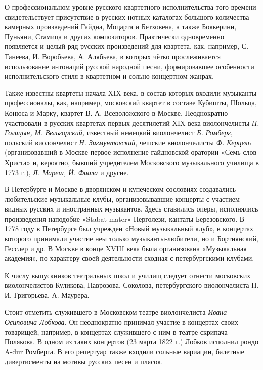 \documentclass[12pt,a4paper,oneside,titlepage,draft]{extreport}
\begin{document}
О профессиональном уровне русского квартетного 
исполнительства того времени свидетельствует присутствие в русских нотных каталогах большого количества камерных произведений Гайдна, Моцарта и Бетховена, а также Боккерини, Пуньяни, Стамица и других композиторов. Практически одновременно 
появляется и целый ряд русских произведений для квартета,
как, например, С. Танеева, И. Воробьева, А. Алябьева, в которых чётко прослеживается использование интонаций
русской народной песни, формировавшее особенности исполнительского стиля в 
квартетном и сольно-концертном жанрах.

Также известны квартеты начала XIX века, в состав которых входили 
музыканты-профессионалы, как, например, московский квартет в
составе Кубишты, Шольца, Конюса и Марку, квартет В. А. Всеволожского в Москве. Неоднократно участвовали в русских квартетах первых десятилетий
XIX века виолончелисты \emph{Н. Голицын, М. Вельгорский,} известный немецкий виолончелист \emph{Б. Ромберг}, польский виолончелист \emph{Н. Зигмунтовский}, чешские виолончелисты \emph{Ф. Керцель} (организовавший в Москве первое
исполнение гайдновской оратории «Семь слов Христа» и, вероятно, бывший учредителем 
Московского музыкального училища в 1773 г.), \emph{Я. Мареш, Й. Фиала} и другие.

В Петербурге и Москве в дворянском и купеческом сословиях создавались любительские музыкальные клубы, организовывавшие концерты с участием видных русских и иностранных музыкантов. Здесь ставились оперы, исполнялись произведения наподобие «Stabat mater» Перголези,
кантаты Березовского. В 1778 году в Петербурге был учрежден «Новый 
музыкальный клуб», в концертах которого принимали участие неы
только музыканты-любители, но и Бортнянский, Гесслер и др.
В Москве в конце XVIII века была организована 
«Музыкальная академия», по характеру своей деятельности 
сходная с петербургскими клубами.

К числу выпускников театральных школ и училищ следует отнести московских виолончелистов Куликова, Наврозова, Соколова, петербургского 
виолончелиста П. И. Григорьева, А. Маурера.

Стоит отметить служившего в Московском театре виолончелиста \emph{Ивана Осиповича Лобкова.} Он неоднократно принимал 
участие в концертах своих товарищей, например, в концертах
служившего с ним в театре скрипача Полякова. В одном из
таких концертов (23 марта 1822 г.) Лобков исполнил рондо A-dur Ромберга.
В его репертуар также входили сольные 
вариации, балетные дивертисменты на 
мотивы русских песен и плясок.
\end{document}
